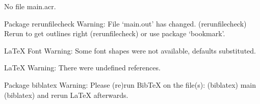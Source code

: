No file main.acr.

Package rerunfilecheck Warning: File `main.out' has changed.
(rerunfilecheck)                Rerun to get outlines right
(rerunfilecheck)                or use package `bookmark'.


LaTeX Font Warning: Some font shapes were not available, defaults substituted.


LaTeX Warning: There were undefined references.


Package biblatex Warning: Please (re)run BibTeX on the file(s):
(biblatex)                main
(biblatex)                and rerun LaTeX afterwards.

